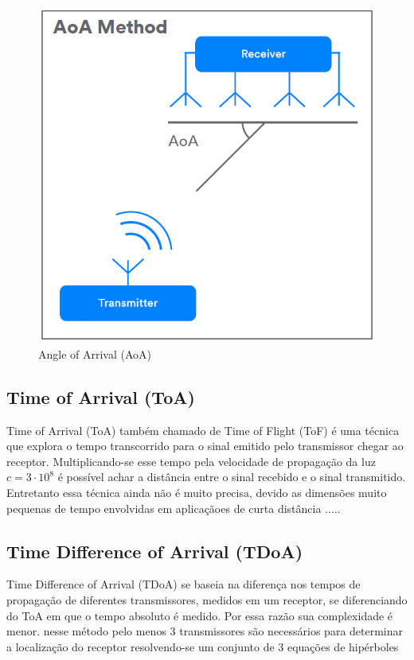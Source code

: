 \begin{figure}[H]
	\centering 
	\includegraphics[scale = 0.6]{images/angle_of_arrival.png}
	\caption{Angle of Arrival (AoA)}
	\label{fig:angle_of_arrival}
\end{figure}

\subsection{Time of Arrival (ToA)}

Time of Arrival (ToA) também chamado de  Time of Flight (ToF) é uma técnica que explora o tempo transcorrido para o sinal emitido pelo transmissor chegar ao receptor. Multiplicando-se esse tempo pela velocidade de propagação da luz \(c = 3 \cdot 10^8\) é possível achar a distância entre o sinal recebido e o sinal transmitido. Entretanto essa técnica ainda não é muito precisa, devido as dimensões muito pequenas de tempo envolvidas em aplicaçãoes de curta distância \cite{art6}.....

\subsection{Time Difference of Arrival (TDoA)}

Time Difference of Arrival (TDoA) se baseia na diferença nos tempos de propagação de diferentes transmissores, medidos em um receptor, se diferenciando do ToA em que o tempo absoluto é medido. Por essa razão sua complexidade é menor.
nesse método pelo menos 3 transmissores são necessários para determinar a localização do receptor resolvendo-se um conjunto de 3 equações de hipérboles \cite{art2}

